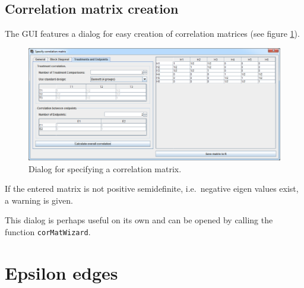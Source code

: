 \documentclass[a4paper, 10pt]{article}\usepackage[]{graphicx}\usepackage[]{color}
\numberwithin{equation}{section}
\theoremstyle{definition}
\newtheorem{Def}{Definition}[section]
\theoremstyle{plain}
\newcommand{\kronecker}{\raisebox{1pt}{\ensuremath{\:\otimes\:}}}
\begin{document}
\subsection{Correlation matrix creation}

The GUI features a dialog for easy creation of correlation matrices (see figure \ref{fig:createCM1}).

\begin{figure}[ht]
  \centering    
  \includegraphics[width=\textwidth]{pictures/createCM3.png}      
  \caption{\label{fig:createCM1} Dialog for specifying a correlation matrix.}
\end{figure}

If the entered matrix is not positive semidefinite, 
i.e.\ negative eigen values exist, a warning is given.

This dialog is perhaps useful on its own and can be opened by 
calling the function \texttt{corMatWizard}.




\section{Epsilon edges}

\end{document}
